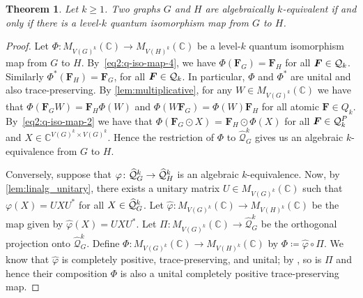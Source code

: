 \documentclass[a4paper,onecolumn,11pt,accepted=2026-01-06]{quantumarticle}
\theoremstyle{plain}
\newtheorem{thm}{Theorem}[section]
\theoremstyle{remark}
\theoremstyle{definition}
\newcommand{\complex}{\mathbb{C}}
\begin{document}
\begin{thm}\label{thm:main-theorem-2}
  Let $k\geq 1$. 
  Two graphs $G$ and $H$ are algebraically $k$-equivalent if and only if there is a level-$k$ quantum isomorphism map from $G$ to $H$.
\end{thm}
\begin{proof}
  Let $\Phi\colon M_{V(G)^k}(\complex) \to M_{V(H)^k}(\complex)$ be a level-$k$ quantum isomorphism map from $G$ to $H$.
  By~\eqref{eq2:q-iso-map-4}, we have $\Phi(\boldsymbol{F}_G) = \boldsymbol{F}_H$ for all $\boldsymbol{F}\in {\mathcal Q}_k$. 
  Similarly $\Phi^*(\boldsymbol{F}_H) = \boldsymbol{F}_G$, for all $\boldsymbol{F}\in {\mathcal Q}_k$.
  In particular, $\Phi$ and $\Phi^*$ are unital and also trace-preserving. 
  By \cref{lem:multiplicative}, for any $W \in M_{V(G)^k}(\mathbb{C})$ we have that $\Phi(\boldsymbol{F}_GW) = \boldsymbol{F}_H\Phi(W)$ and $\Phi(W\boldsymbol{F}_G) = \Phi(W)\boldsymbol{F}_H$ for all atomic $\boldsymbol{F} \in Q_k$.
  By~\eqref{eq2:q-iso-map-2} we have that $\Phi(\boldsymbol{F}_G\odot X)$ = $\boldsymbol{F}_H\odot\Phi(X)$ for all $\boldsymbol{F} \in {\mathcal Q}_k^P$ and $X \in \complex^{V(G)^k\times V(G)^k}$. Hence the restriction of $\Phi$ to $\widehat{\mathcal{Q}}_G^k$ gives us an algebraic $k$-equivalence from $G$ to $H$. 
  
      Conversely, suppose that $\varphi \colon \widehat{{\mathcal Q}}^k_G \to\widehat{{\mathcal Q}}^k_H$ is an algebraic $k$-equivalence. Now, by \cref{lem:linalg_unitary}, there exists a unitary matrix $U \in M_{{V(G)}^k}(\mathbb{C})$ such that $\varphi(X) = UXU^*$ for all $X \in \widehat{{\mathcal Q}}^k_G$.
		Let $\widehat{\varphi} \colon M_{V(G)^k}(\complex) \to M_{V(H)^k}(\complex)$ be the map given by $\widehat{\varphi}(X) = UXU^*$.
		Let $\Pi \colon M_{V(G)^k}(\complex) \to \widehat{\mathcal{Q}}^k_G$ be the orthogonal projection onto $\widehat{\mathcal{Q}}^k_G$.
		Define $\Phi \colon M_{V(G)^k}(\complex) \to M_{V(H)^k}(\complex)$ by $\Phi \coloneqq \widehat{\varphi} \circ \Pi$.
		We know that $\widehat{\varphi}$ is completely positive, trace-preserving, and unital; by \cite[Lemma~5.4]{david_mathprog}, so is $\Pi$ and hence their composition $\Phi$ is also a unital completely positive trace-preserving map. 
		

\end{proof}
\end{document}
